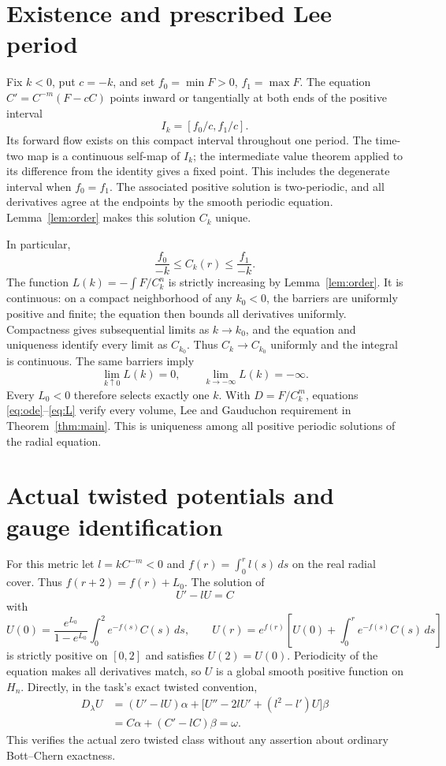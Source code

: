 \documentclass[11pt]{article}
\theoremstyle{remark}\newtheorem{remark}[theorem]{Remark}
\begin{document}
\section{Existence and prescribed Lee period}
Fix $k<0$, put $c=-k$, and set $f_0=\min F>0$, $f_1=\max F$.
The equation $C'=C^{-m}(F-cC)$ points inward or tangentially at
both ends of the positive interval
\[
 I_k=[f_0/c,f_1/c].
\]
Its forward flow exists on this compact interval throughout one
period. The time-two map is a continuous self-map of $I_k$;
the intermediate value theorem applied to its difference from the
identity gives a fixed point. This includes the degenerate interval
when $f_0=f_1$. The associated positive solution is two-periodic,
and all derivatives agree at the endpoints by the smooth periodic
equation. Lemma~\ref{lem:order} makes this solution $C_k$ unique.

In particular,
\begin{equation}\label{eq:barriers}
 \frac{f_0}{-k}\le C_k(r)\le\frac{f_1}{-k}.
\end{equation}
The function $L(k)=-\int F/C_k^n$ is strictly increasing by
Lemma~\ref{lem:order}. It is continuous: on a compact neighborhood
of any $k_0<0$, the barriers are uniformly positive and finite;
the equation then bounds all derivatives uniformly. Compactness
gives subsequential limits as $k\to k_0$, and the equation and
uniqueness identify every limit as $C_{k_0}$. Thus $C_k\to C_{k_0}$
uniformly and the integral is continuous. The same barriers imply
\[
 \lim_{k\uparrow0}L(k)=0,
 \qquad \lim_{k\to-\infty}L(k)=-\infty.
\]
Every $L_0<0$ therefore selects exactly one $k$. With
$D=F/C_k^m$, equations \eqref{eq:ode}--\eqref{eq:L} verify every
volume, Lee and Gauduchon requirement in
Theorem~\ref{thm:main}. This is uniqueness among all positive
periodic solutions of the radial equation.

\section{Actual twisted potentials and gauge identification}
For this metric let $l=kC^{-m}<0$ and
$f(r)=\int_0^rl(s)\,ds$ on the real radial cover. Thus
$f(r+2)=f(r)+L_0$. The solution of
\begin{equation}\label{eq:U}
 U'-lU=C
\end{equation}
with
\[
 U(0)=\frac{e^{L_0}}{1-e^{L_0}}
       \int_0^2e^{-f(s)}C(s)\,ds,
 \qquad
 U(r)=e^{f(r)}\left[U(0)+\int_0^re^{-f(s)}C(s)\,ds\right]
\]
is strictly positive on $[0,2]$ and satisfies $U(2)=U(0)$.
Periodicity of the equation makes all derivatives match, so $U$
is a global smooth positive function on $H_n$. Directly, in the
task's exact twisted convention,
\begin{align*}
 D_\lambda U
 &= (U'-lU)\alpha+
    \bigl[U''-2lU'+(l^2-l')U\bigr]\beta\\
 &=C\alpha+(C'-lC)\beta=\omega.
\end{align*}
This verifies the actual zero twisted class without any assertion
about ordinary Bott--Chern exactness.
\end{document}
